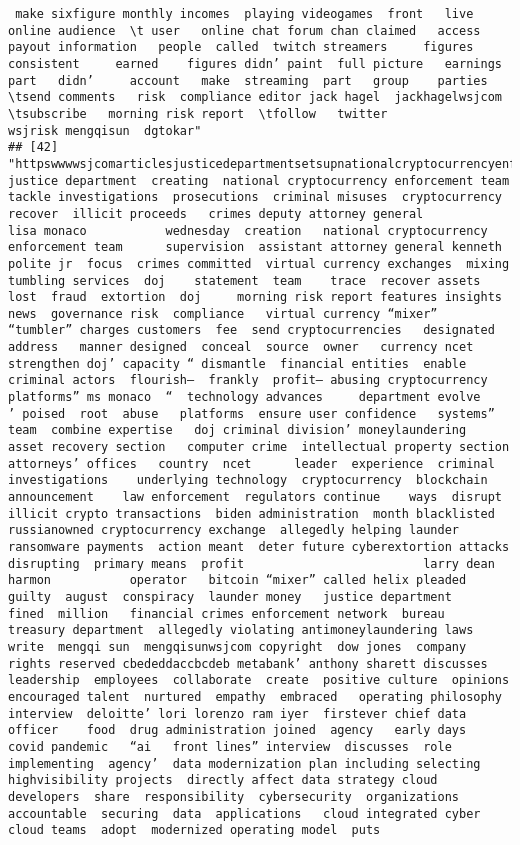 \documentclass[
]{article}
\begin{document}
\begin{verbatim}
 make sixfigure monthly incomes  playing videogames  front   live online audience  \t user   online chat forum chan claimed   access   payout information   people  called  twitch streamers     figures  consistent     earned    figures didn’ paint  full picture   earnings  part   didn’     account   make  streaming  part   group    parties  \tsend comments   risk  compliance editor jack hagel  jackhagelwsjcom \tsubscribe   morning risk report  \tfollow   twitter  wsjrisk mengqisun  dgtokar"
## [42] "httpswwwwsjcomarticlesjusticedepartmentsetsupnationalcryptocurrencyenforcementteam   justice department  creating  national cryptocurrency enforcement team  tackle investigations  prosecutions  criminal misuses  cryptocurrency   recover  illicit proceeds   crimes deputy attorney general                       lisa monaco           wednesday  creation   national cryptocurrency enforcement team      supervision  assistant attorney general kenneth polite jr  focus  crimes committed  virtual currency exchanges  mixing  tumbling services  doj    statement  team    trace  recover assets lost  fraud  extortion  doj     morning risk report features insights  news  governance risk  compliance   virtual currency “mixer”  “tumbler” charges customers  fee  send cryptocurrencies   designated address   manner designed  conceal  source  owner   currency ncet  strengthen doj’ capacity “ dismantle  financial entities  enable criminal actors  flourish—  frankly  profit— abusing cryptocurrency platforms” ms monaco  “  technology advances     department evolve     ’ poised  root  abuse   platforms  ensure user confidence   systems”    team  combine expertise   doj criminal division’ moneylaundering  asset recovery section   computer crime  intellectual property section      attorneys’ offices   country  ncet      leader  experience  criminal investigations    underlying technology  cryptocurrency  blockchain  announcement    law enforcement  regulators continue    ways  disrupt illicit crypto transactions  biden administration  month blacklisted  russianowned cryptocurrency exchange  allegedly helping launder ransomware payments  action meant  deter future cyberextortion attacks  disrupting  primary means  profit                         larry dean harmon           operator   bitcoin “mixer” called helix pleaded guilty  august  conspiracy  launder money   justice department     fined  million   financial crimes enforcement network  bureau    treasury department  allegedly violating antimoneylaundering laws     write  mengqi sun  mengqisunwsjcom copyright  dow jones  company   rights reserved cbededdaccbcdeb metabank’ anthony sharett discusses  leadership  employees  collaborate  create  positive culture  opinions  encouraged talent  nurtured  empathy  embraced   operating philosophy   interview  deloitte’ lori lorenzo ram iyer  firstever chief data officer    food  drug administration joined  agency   early days   covid pandemic   “ai   front lines” interview  discusses  role  implementing  agency’  data modernization plan including selecting highvisibility projects  directly affect data strategy cloud developers  share  responsibility  cybersecurity  organizations  accountable  securing  data  applications   cloud integrated cyber  cloud teams  adopt  modernized operating model  puts 
\end{verbatim}
\end{document}
